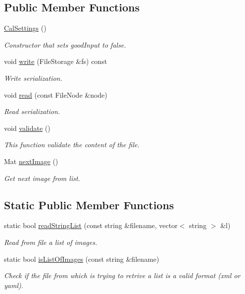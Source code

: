 \subsection*{Public Member Functions}
\begin{DoxyCompactItemize}
\item 
\mbox{\hyperlink{class_cal_settings_aaac5ae85b32281c75a540211a183ae5b}{Cal\+Settings}} ()
\begin{DoxyCompactList}\small\item\em Constructor that sets {\ttfamily good\+Input} to false. \end{DoxyCompactList}\item 
void \mbox{\hyperlink{class_cal_settings_a1e7ebff7ec6beb793febbe245ac753bd}{write}} (File\+Storage \&fs) const
\begin{DoxyCompactList}\small\item\em Write serialization. \end{DoxyCompactList}\item 
void \mbox{\hyperlink{class_cal_settings_a984d8ace934885b4da7bad3618db714d}{read}} (const File\+Node \&node)
\begin{DoxyCompactList}\small\item\em Read serialization. \end{DoxyCompactList}\item 
void \mbox{\hyperlink{class_cal_settings_ae7f2a16c9f1839485cc12f52cf98f67e}{validate}} ()
\begin{DoxyCompactList}\small\item\em This function validate the content of the file. \end{DoxyCompactList}\item 
Mat \mbox{\hyperlink{class_cal_settings_ad68c39e7310537b4eb00b244da338b17}{next\+Image}} ()
\begin{DoxyCompactList}\small\item\em Get next image from list. \end{DoxyCompactList}\end{DoxyCompactItemize}
\subsection*{Static Public Member Functions}
\begin{DoxyCompactItemize}
\item 
static bool \mbox{\hyperlink{class_cal_settings_a33788fa83ce965ffa2e27c5690f5aa8e}{read\+String\+List}} (const string \&filename, vector$<$ string $>$ \&l)
\begin{DoxyCompactList}\small\item\em Read from file a list of images. \end{DoxyCompactList}\item 
static bool \mbox{\hyperlink{class_cal_settings_a43c8b23d4f8d7c8cb1fd9204e9478ce0}{is\+List\+Of\+Images}} (const string \&filename)
\begin{DoxyCompactList}\small\item\em Check if the file from which is trying to retrive a list is a valid format (xml or yaml). \end{DoxyCompactList}\end{DoxyCompactItemize}
